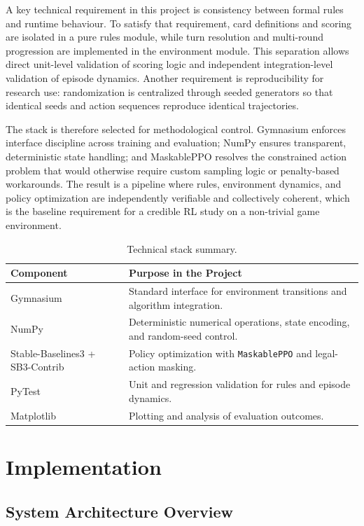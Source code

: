 \documentclass[10pt]{article}
\begin{document}
A key technical requirement in this project is consistency between formal rules and runtime behaviour. To satisfy that requirement, card definitions and scoring are isolated in a pure rules module, while turn resolution and multi-round progression are implemented in the environment module. This separation allows direct unit-level validation of scoring logic and independent integration-level validation of episode dynamics. Another requirement is reproducibility for research use: randomization is centralized through seeded generators so that identical seeds and action sequences reproduce identical trajectories.

The stack is therefore selected for methodological control. Gymnasium enforces interface discipline across training and evaluation; NumPy ensures transparent, deterministic state handling; and MaskablePPO resolves the constrained action problem that would otherwise require custom sampling logic or penalty-based workarounds. The result is a pipeline where rules, environment dynamics, and policy optimization are independently verifiable and collectively coherent, which is the baseline requirement for a credible RL study on a non-trivial game environment.

\begin{table}[ht]
\centering
\begin{tabularx}{\textwidth}{@{}lY@{}}
\toprule
\textbf{Component} & \textbf{Purpose in the Project} \\
\midrule
Gymnasium & Standard interface for environment transitions and algorithm integration. \\
NumPy & Deterministic numerical operations, state encoding, and random-seed control. \\
Stable-Baselines3 + SB3-Contrib & Policy optimization with \texttt{MaskablePPO} and legal-action masking. \\
PyTest & Unit and regression validation for rules and episode dynamics. \\
Matplotlib & Plotting and analysis of evaluation outcomes. \\
\bottomrule
\end{tabularx}
\caption{Technical stack summary.}
\end{table}

\section{Implementation}

\subsection{System Architecture Overview}
\end{document}
